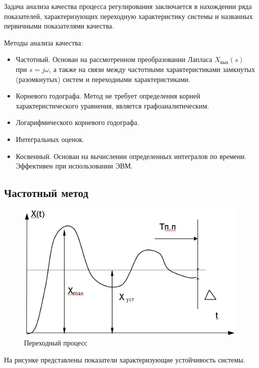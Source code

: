 \documentclass[unicode, 12pt, a4paper, oneside]{article}
\begin{document}
Задача анализа качества процесса регулирования заключается в нахождении ряда показателей, характеризующих переходную характеристику системы и названных первичными показателями качества.

Методы анализа качества:
\begin{itemize}
\item Частотный. Основан на рассмотренном преобразовании Лапласа $ X_\text{вых}(s) $ при $ s = j\omega $, а также на связи между частотными характеристиками замкнутых (разомкнутых) систем и переходными характеристиками.
\item Корневого годографа. Метод не требует определения корней характеристического уравнения, является графоаналитическим.
\item Логарифмического корневого годографа.
\item Интегральных оценок.
\item Косвенный. Основан на вычислении определенных интегралов по времени. Эффективен при использовании ЭВМ.
\end{itemize}

\subsection*{Частотный метод}

\begin{figure}
\centering
\includegraphics[width=\linewidth]{28_proc.png}
\caption{Переходный процесс}
\end{figure}

На рисунке представлены показатели характеризующие устойчивость системы.
\end{document}

